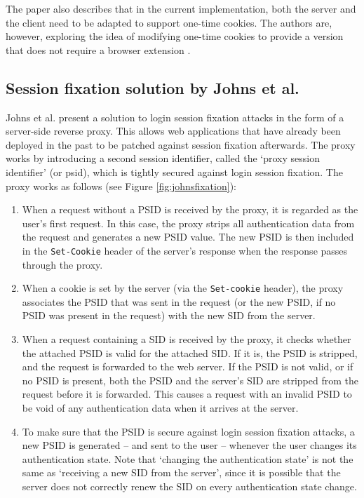 The paper also describes that in the current implementation, both the server and the client need to be adapted to support one-time cookies. The authors are, however, exploring the idea of modifying one-time cookies to provide a version that does not require a browser extension \cite{Dacosta2011}.

\subsection{Session fixation solution by Johns et al.}

Johns et al. \cite{Johns2011} present a solution to \gls{login session fixation} attacks in the form of a server-side reverse proxy. This allows web applications that have already been deployed in the past to be patched against session fixation afterwards. The proxy works by introducing a second session identifier, called the `proxy session identifier' (or \gls{psid}), which is tightly secured against login session fixation. The proxy works as follows (see Figure \ref{fig:johnsfixation}):
\begin{enumerate}
	\item When a request without a PSID is received by the proxy, it is regarded as the user's first request. In this case, the proxy strips all authentication data from the request and generates a new PSID value. The new PSID is then included in the \texttt{Set-Cookie} header of the server's response when the response passes through the proxy.
	\item When a cookie is set by the server (via the \texttt{Set-cookie} header), the proxy associates the PSID that was sent in the request (or the new PSID, if no PSID was present in the request) with the new SID from the server.
	\item When a request containing a SID is received by the proxy, it checks whether the attached PSID is valid for the attached SID. If it is, the PSID is stripped, and the request is forwarded to the web server. If the PSID is not valid, or if no PSID is present, both the PSID and the server's SID are stripped from the request before it is forwarded. This causes a request with an invalid PSID to be void of any authentication data when it arrives at the server.
	\item To make sure that the PSID is secure against login session fixation attacks, a new PSID is generated -- and sent to the user -- whenever the user changes its authentication state. Note that `changing the authentication state' is not the same as `receiving a new SID from the server', since it is possible that the server does not correctly renew the SID on every authentication state change.
\end{enumerate}

